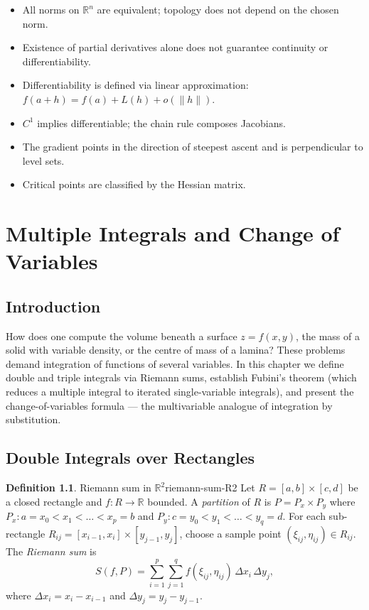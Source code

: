 \documentclass[12pt,a4paper]{book}
\theoremstyle{definition}
\newtheorem{definition}{Definition}[chapter]
\begin{document}
\begin{itemize}
  \item All norms on $\mathbb{R}^n$ are equivalent; topology does not depend
    on the chosen norm.
  \item Existence of partial derivatives alone does not guarantee continuity
    or differentiability.
  \item Differentiability is defined via linear approximation: $f(a+h)
    =f(a)+L(h)+o(\|h\|)$.
  \item $C^1$ implies differentiable; the chain rule composes Jacobians.
  \item The gradient points in the direction of steepest ascent and is
    perpendicular to level sets.
  \item Critical points are classified by the Hessian matrix.
\end{itemize}



\chapter{Multiple Integrals and Change of Variables}
\label{ch:multiple-integrals}

\section*{Introduction}

How does one compute the volume beneath a surface $z=f(x,y)$, the mass of a
solid with variable density, or the centre of mass of a lamina?  These
problems demand integration of functions of several variables.  In this
chapter we define double and triple integrals via Riemann sums, establish
Fubini's theorem (which reduces a multiple integral to iterated
single-variable integrals), and present the change-of-variables formula ---
the multivariable analogue of integration by substitution.

\section{Double Integrals over Rectangles}
\label{sec:double-int-rect}

\begin{definition}{Riemann sum in $\mathbb{R}^2$}{riemann-sum-R2}
Let $R=[a,b]\times[c,d]$ be a closed rectangle and $f\colon R\to\mathbb{R}$
bounded.  A \emph{partition} of $R$ is $P=P_x\times P_y$ where
$P_x\colon a=x_0<x_1<\dots<x_p=b$ and
$P_y\colon c=y_0<y_1<\dots<y_q=d$.  For each sub-rectangle
$R_{ij}=[x_{i-1},x_i]\times[y_{j-1},y_j]$, choose a sample point
$(\xi_{ij},\eta_{ij})\in R_{ij}$.  The \emph{Riemann sum} is
\[
  S(f,P)=\sum_{i=1}^p\sum_{j=1}^q
    f(\xi_{ij},\eta_{ij})\,\Delta x_i\,\Delta y_j,
\]
where $\Delta x_i=x_i-x_{i-1}$ and $\Delta y_j=y_j-y_{j-1}$.
\end{definition}
\end{document}
